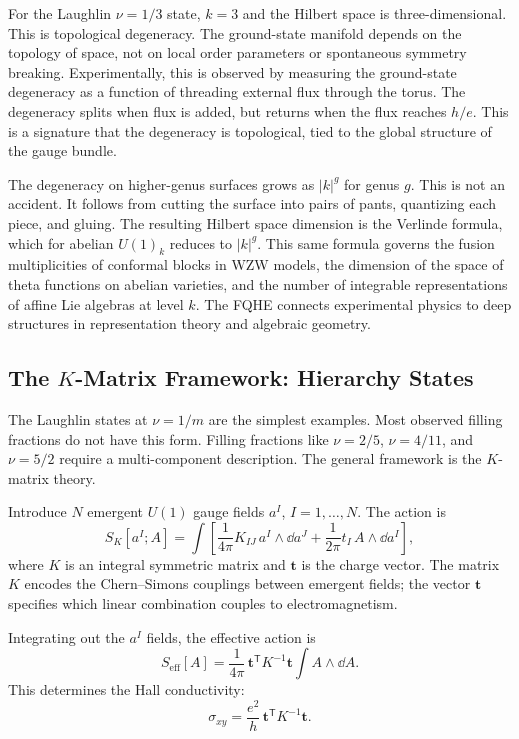 For the Laughlin $\nu=1/3$ state, $k=3$ and the Hilbert space is three-dimensional. This is topological degeneracy. The ground-state manifold depends on the topology of space, not on local order parameters or spontaneous symmetry breaking. Experimentally, this is observed by measuring the ground-state degeneracy as a function of threading external flux through the torus. The degeneracy splits when flux is added, but returns when the flux reaches $h/e$. This is a signature that the degeneracy is topological, tied to the global structure of the gauge bundle.

The degeneracy on higher-genus surfaces grows as $|k|^g$ for genus $g$. This is not an accident. It follows from cutting the surface into pairs of pants, quantizing each piece, and gluing. The resulting Hilbert space dimension is the Verlinde formula, which for abelian $U(1)_k$ reduces to $|k|^g$. This same formula governs the fusion multiplicities of conformal blocks in WZW models, the dimension of the space of theta functions on abelian varieties, and the number of integrable representations of affine Lie algebras at level $k$. The FQHE connects experimental physics to deep structures in representation theory and algebraic geometry.

\subsection{The $K$-Matrix Framework: Hierarchy States}
\label{subsec:fqhe-k-matrix}

The Laughlin states at $\nu=1/m$ are the simplest examples. Most observed filling fractions do not have this form. Filling fractions like $\nu=2/5$, $\nu=4/11$, and $\nu=5/2$ require a multi-component description. The general framework is the $K$-matrix theory.

Introduce $N$ emergent $U(1)$ gauge fields $a^I$, $I=1,\ldots,N$. The action is
\begin{equation}
  S_K[a^I;A]
  =
  \int\left[
  \frac{1}{4\pi}K_{IJ}\,a^I\wedge\dd a^J
  +
  \frac{1}{2\pi}t_I\,A\wedge\dd a^I
  \right],
  \label{eq:fqhe-k-matrix-action}
\end{equation}
where $K$ is an integral symmetric matrix and $\mathbf{t}$ is the charge vector. The matrix $K$ encodes the Chern--Simons couplings between emergent fields; the vector $\mathbf{t}$ specifies which linear combination couples to electromagnetism.

Integrating out the $a^I$ fields, the effective action is
\begin{equation}
  S_{\mathrm{eff}}[A]
  =
  \frac{1}{4\pi}\,\mathbf{t}^{\mathsf{T}}K^{-1}\mathbf{t}
  \int A\wedge\dd A.
  \label{eq:fqhe-k-effective}
\end{equation}
This determines the Hall conductivity:
\begin{equation}
  \sigma_{xy}
  =
  \frac{e^2}{h}\,\mathbf{t}^{\mathsf{T}}K^{-1}\mathbf{t}.
  \label{eq:fqhe-k-hall}
\end{equation}

